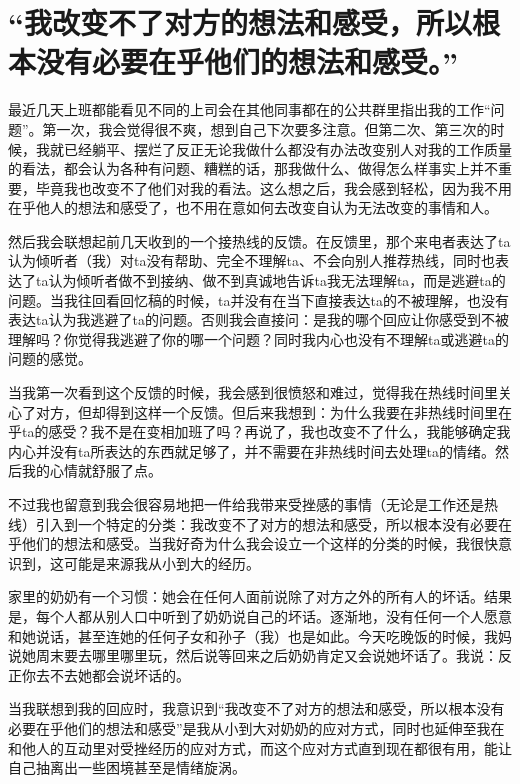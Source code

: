 \chapter{“我改变不了对方的想法和感受，所以根本没有必要在乎他们的想法和感受。”}




最近几天上班都能看见不同的上司会在其他同事都在的公共群里指出我的工作“问题”。第一次，我会觉得很不爽，想到自己下次要多注意。但第二次、第三次的时候，我就已经躺平、摆烂了\pozhehao{}反正无论我做什么都没有办法改变别人对我的工作质量的看法，都会认为各种有问题、糟糕的话，那我做什么、做得怎么样事实上并不重要，毕竟我也改变不了他们对我的看法。这么想之后，我会感到轻松，因为我不用在乎他人的想法和感受了，也不用在意如何去改变自认为无法改变的事情和人。

然后我会联想起前几天收到的一个接热线的反馈。在反馈里，那个来电者表达了ta认为倾听者（我）对ta没有帮助、完全不理解ta、不会向别人推荐热线，同时也表达了ta认为倾听者做不到接纳、做不到真诚地告诉ta我无法理解ta，而是逃避ta的问题。当我往回看回忆稿的时候，ta并没有在当下直接表达ta的不被理解，也没有表达ta认为我逃避了ta的问题。否则我会直接问：是我的哪个回应让你感受到不被理解吗？你觉得我逃避了你的哪一个问题？同时我内心也没有不理解ta或逃避ta的问题的感觉。

当我第一次看到这个反馈的时候，我会感到很愤怒和难过，觉得我在热线时间里关心了对方，但却得到这样一个反馈。但后来我想到：为什么我要在非热线时间里在乎ta的感受？我不是在变相加班了吗？再说了，我也改变不了什么，我能够确定我内心并没有ta所表达的东西就足够了，并不需要在非热线时间去处理ta的情绪。然后我的心情就舒服了点。

不过我也留意到我会很容易地把一件给我带来受挫感的事情（无论是工作还是热线）引入到一个特定的分类：我改变不了对方的想法和感受，所以根本没有必要在乎他们的想法和感受。当我好奇为什么我会设立一个这样的分类的时候，我很快意识到，这可能是来源我从小到大的经历。

家里的奶奶有一个习惯：她会在任何人面前说除了对方之外的所有人的坏话。结果是，每个人都从别人口中听到了奶奶说自己的坏话。逐渐地，没有任何一个人愿意和她说话，甚至连她的任何子女和孙子（我）也是如此。今天吃晚饭的时候，我妈说她周末要去哪里哪里玩，然后说等回来之后奶奶肯定又会说她坏话了。我说：反正你去不去她都会说坏话的。

当我联想到我的回应时，我意识到“我改变不了对方的想法和感受，所以根本没有必要在乎他们的想法和感受”是我从小到大对奶奶的应对方式，同时也延伸至我在和他人的互动里对受挫经历的应对方式，而这个应对方式直到现在都很有用，能让自己抽离出一些困境甚至是情绪旋涡。

